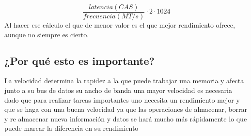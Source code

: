 \documentclass{article}
\begin{document}
$$\frac{latencia(CAS)}{frecuencia(MT/s )}\cdot2\cdot1024$$ \cite{formula}
Al hacer ese cálculo el que de menor valor es el que mejor rendimiento ofrece, aunque no siempre es cierto.\cite{frecuencia_latencia}
\subsection{¿Por qué esto es importante?}

La velocidad determina la rapidez a la que puede trabajar una memoria y afecta junto a su bus de datos su ancho de banda una mayor velocidad es necesaria dado que para realizar tareas importantes uno necesita un rendimiento mejor y que se haga con una buena velocidad ya que las operaciones de almacenar, borrar y re almacenar nueva información y datos se hará mucho más rápidamente lo que puede marcar la diferencia en su rendimiento 
\cite{memoria_imp}





\newpage


\end{document}
